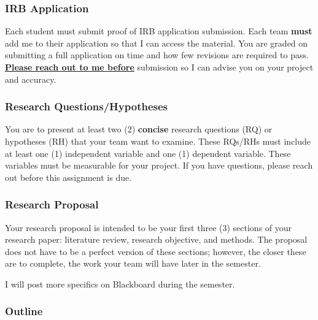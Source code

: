 \documentclass[
  b5paper]{book}
\begin{document}
\hypertarget{irb-application}{%
\subsubsection*{IRB Application}\label{irb-application}}

Each student must submit proof of IRB application submission. Each team \textbf{must} add me to their application so that I can access the material. You are graded on submitting a full application on time and how few revisions are required to pass. \ul{\textbf{Please reach out to me before}} submission so I can advise you on your project and accuracy.

\hypertarget{research-questionshypotheses}{%
\subsubsection*{Research Questions/Hypotheses}\label{research-questionshypotheses}}

You are to present at least two (2) \textbf{concise} research questions (RQ) or hypotheses (RH) that your team want to examine. These RQs/RHs must include at least one (1) independent variable and one (1) dependent variable. These variables must be measurable for your project. If you have questions, please reach out before this assignment is due.

\hypertarget{research-proposal}{%
\subsubsection*{Research Proposal}\label{research-proposal}}

Your research proposal is intended to be your first three (3) sections of your research paper: literature review, research objective, and methods. The proposal does not have to be a perfect version of these sections; however, the closer these are to complete, the work your team will have later in the semester.

I will post more specifics on Blackboard during the semester.

\hypertarget{outline}{%
\subsubsection*{Outline}\label{outline}}
\end{document}
